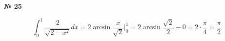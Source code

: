 \documentclass{article}
\begin{document}
\textbf{№ 25} 

$$ \int_{0}^{1} \frac{2}{\sqrt{2-x^2}} dx 
= 2\arcsin{\frac{x}{\sqrt{2}}} \bigg\vert_{0}^{1}
= 2\arcsin{\frac{\sqrt{2}}{2}} - 0 
= 2 \cdot \frac{\pi}{4}
= \frac{\pi}{2} $$
\end{document}
